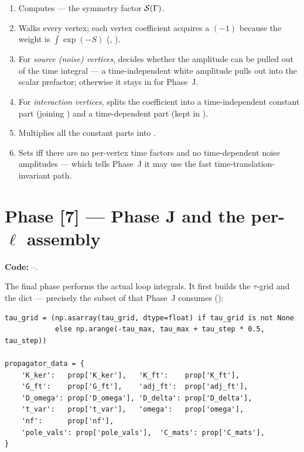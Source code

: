 \begin{enumerate}
  \item Computes  --- the symmetry factor
        $\mathcal{S}(\Gamma)$.
  \item Walks every vertex; each vertex coefficient acquires a $(-1)$ because the
        weight is $\int \exp(-S)$ (,
        ).
  \item For \emph{source (noise) vertices}, decides whether the amplitude can be
        pulled out of the time integral --- a time-independent white amplitude
        pulls out into the scalar prefactor; otherwise it stays in
         for Phase~J.
  \item For \emph{interaction vertices}, splits the coefficient into a
        time-independent constant part (joining ) and a
        time-dependent part (kept in ).
  \item Multiplies all the constant parts into .
  \item Sets   iff there are no per-vertex time
        factors and no time-dependent noise amplitudes --- which tells Phase~J it
        may use the fast time-translation-invariant path.
\end{enumerate}

\section{Phase [7] --- Phase J and the per-\texorpdfstring{$\ell$}{ell} assembly}\label{sec:co-phasej}

\textbf{Code:} --.

The final phase performs the actual loop integrals. It first builds the
$\tau$-grid and the  dict --- precisely the subset of
 that Phase~J consumes ():

\begin{lstlisting}
tau_grid = (np.asarray(tau_grid, dtype=float) if tau_grid is not None
            else np.arange(-tau_max, tau_max + tau_step * 0.5, tau_step))

propagator_data = {
    'K_ker':   prop['K_ker'],   'K_ft':    prop['K_ft'],
    'G_ft':    prop['G_ft'],    'adj_ft':  prop['adj_ft'],
    'D_omega': prop['D_omega'], 'D_delta': prop['D_delta'],
    't_var':   prop['t_var'],   'omega':   prop['omega'],
    'nf':      prop['nf'],
    'pole_vals': prop['pole_vals'],  'C_mats': prop['C_mats'],
}
\end{lstlisting}

